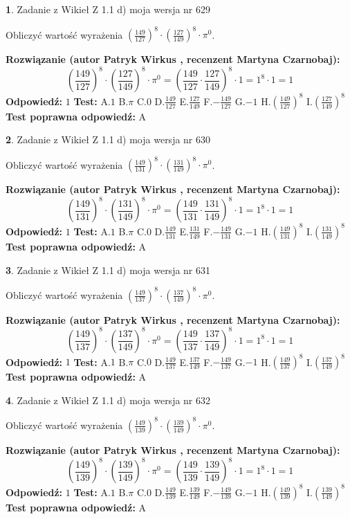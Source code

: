 \documentclass[12pt, a4paper]{article}
\theoremstyle{definition} %
\newtheorem{zad}{}
\newcommand{\zadStart}[1]{\begin{zad}#1\newline}
\newcommand{\zadStop}{\end{zad}}
\newcommand{\rozwStart}[2]{\noindent \textbf{Rozwiązanie (autor #1 , recenzent #2): }\newline}
\newcommand{\rozwStop}{\newline}
\newcommand{\odpStart}{\noindent \textbf{Odpowiedź:}\newline}
\newcommand{\odpStop}{\newline}
\newcommand{\testStart}{\noindent \textbf{Test:}\newline}
\newcommand{\testStop}{\newline}
\newcommand{\kluczStart}{\noindent \textbf{Test poprawna odpowiedź:}\newline}
\newcommand{\kluczStop}{\newline}
\begin{document}
\zadStart{Zadanie z Wikieł Z 1.1 d) moja wersja nr 629}

Obliczyć wartość wyrażenia $(\frac{149}{127})^{8} \cdot (\frac{127}{149})^{8} \cdot \pi^{0}$.
\zadStop
\rozwStart{Patryk Wirkus}{Martyna Czarnobaj}
$$(\frac{149}{127})^{8} \cdot (\frac{127}{149})^{8} \cdot \pi^{0} = (\frac{149}{127} \cdot \frac{127}{149})^{8} \cdot 1 = 1^{8} \cdot 1 = 1$$
\rozwStop
\odpStart
$1$
\odpStop
\testStart
A.$1$ B.$\pi$ C.$0$ D.$\frac{149}{127}$ E.$\frac{127}{149}$
F.$-\frac{149}{127}$ G.$-1$
H.$(\frac{149}{127})^{8}$
I.$(\frac{127}{149})^{8}$
\testStop
\kluczStart
A
\kluczStop



\zadStart{Zadanie z Wikieł Z 1.1 d) moja wersja nr 630}

Obliczyć wartość wyrażenia $(\frac{149}{131})^{8} \cdot (\frac{131}{149})^{8} \cdot \pi^{0}$.
\zadStop
\rozwStart{Patryk Wirkus}{Martyna Czarnobaj}
$$(\frac{149}{131})^{8} \cdot (\frac{131}{149})^{8} \cdot \pi^{0} = (\frac{149}{131} \cdot \frac{131}{149})^{8} \cdot 1 = 1^{8} \cdot 1 = 1$$
\rozwStop
\odpStart
$1$
\odpStop
\testStart
A.$1$ B.$\pi$ C.$0$ D.$\frac{149}{131}$ E.$\frac{131}{149}$
F.$-\frac{149}{131}$ G.$-1$
H.$(\frac{149}{131})^{8}$
I.$(\frac{131}{149})^{8}$
\testStop
\kluczStart
A
\kluczStop



\zadStart{Zadanie z Wikieł Z 1.1 d) moja wersja nr 631}

Obliczyć wartość wyrażenia $(\frac{149}{137})^{8} \cdot (\frac{137}{149})^{8} \cdot \pi^{0}$.
\zadStop
\rozwStart{Patryk Wirkus}{Martyna Czarnobaj}
$$(\frac{149}{137})^{8} \cdot (\frac{137}{149})^{8} \cdot \pi^{0} = (\frac{149}{137} \cdot \frac{137}{149})^{8} \cdot 1 = 1^{8} \cdot 1 = 1$$
\rozwStop
\odpStart
$1$
\odpStop
\testStart
A.$1$ B.$\pi$ C.$0$ D.$\frac{149}{137}$ E.$\frac{137}{149}$
F.$-\frac{149}{137}$ G.$-1$
H.$(\frac{149}{137})^{8}$
I.$(\frac{137}{149})^{8}$
\testStop
\kluczStart
A
\kluczStop



\zadStart{Zadanie z Wikieł Z 1.1 d) moja wersja nr 632}

Obliczyć wartość wyrażenia $(\frac{149}{139})^{8} \cdot (\frac{139}{149})^{8} \cdot \pi^{0}$.
\zadStop
\rozwStart{Patryk Wirkus}{Martyna Czarnobaj}
$$(\frac{149}{139})^{8} \cdot (\frac{139}{149})^{8} \cdot \pi^{0} = (\frac{149}{139} \cdot \frac{139}{149})^{8} \cdot 1 = 1^{8} \cdot 1 = 1$$
\rozwStop
\odpStart
$1$
\odpStop
\testStart
A.$1$ B.$\pi$ C.$0$ D.$\frac{149}{139}$ E.$\frac{139}{149}$
F.$-\frac{149}{139}$ G.$-1$
H.$(\frac{149}{139})^{8}$
I.$(\frac{139}{149})^{8}$
\testStop
\kluczStart
A
\kluczStop
\end{document}
